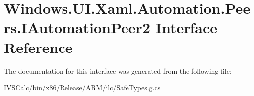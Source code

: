 \hypertarget{interface_windows_1_1_u_i_1_1_xaml_1_1_automation_1_1_peers_1_1_i_automation_peer2}{}\section{Windows.\+U\+I.\+Xaml.\+Automation.\+Peers.\+I\+Automation\+Peer2 Interface Reference}
\label{interface_windows_1_1_u_i_1_1_xaml_1_1_automation_1_1_peers_1_1_i_automation_peer2}


The documentation for this interface was generated from the following file\+:\begin{DoxyCompactItemize}
\item 
I\+V\+S\+Calc/bin/x86/\+Release/\+A\+R\+M/ilc/Safe\+Types.\+g.\+cs\end{DoxyCompactItemize}
